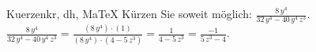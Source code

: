 \begin{MAufgabe}{Kuerzen}{kr, dh, MaTeX}
K\"urzen Sie soweit m\"oglich: $\frac{8\, y^4}{32\, y^4 - 40\, y^4\, z^3}$.\\ 
\ifLsg\MLoesung
\quad $\frac{8\, y^4}{32\, y^4 - 40\, y^4\, z^3}=\frac{(8\, y^4)\cdot(1)}{(8\, y^4)\cdot(4 - 5\, z^3)}=\frac{1}{4 - 5\, z^3}=\frac{-1}{5\, z^3 - 4}$.\else\relax\fi
 \end{MAufgabe}